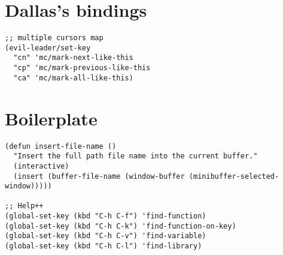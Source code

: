 \documentclass[11pt]{article}
\begin{document}
\section{Dallas's bindings}
\label{sec-13}


\begin{verbatim}
;; multiple cursors map
(evil-leader/set-key
  "cn" 'mc/mark-next-like-this
  "cp" 'mc/mark-previous-like-this
  "ca" 'mc/mark-all-like-this)
\end{verbatim}
\section{Boilerplate}
\label{sec-14}


\begin{verbatim}
(defun insert-file-name ()
  "Insert the full path file name into the current buffer."
  (interactive)
  (insert (buffer-file-name (window-buffer (minibuffer-selected-window)))))

;; Help++
(global-set-key (kbd "C-h C-f") 'find-function)
(global-set-key (kbd "C-h C-k") 'find-function-on-key)
(global-set-key (kbd "C-h C-v") 'find-variable)
(global-set-key (kbd "C-h C-l") 'find-library)
\end{verbatim}
\end{document}
